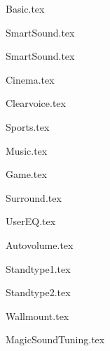 {Basic.tex}

{SmartSound.tex}

{SmartSound.tex}

{Cinema.tex}

{Clearvoice.tex}

{Sports.tex}

{Music.tex}

{Game.tex}

{Surround.tex}


{UserEQ.tex}

{Autovolume.tex}

{Standtype1.tex}

 {Standtype2.tex}

 {Wallmount.tex}

{MagicSoundTuning.tex}